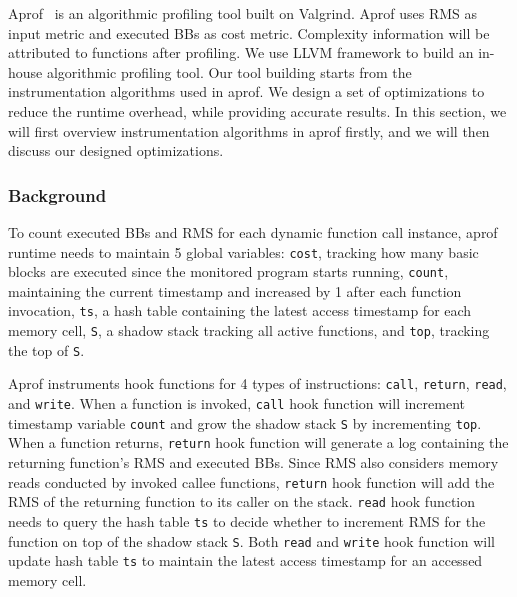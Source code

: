 Aprof~\cite{Aprof1, Aprof2} is an algorithmic profiling tool built on Valgrind. 
Aprof uses RMS as input metric and executed BBs as cost metric.
Complexity information will be attributed to functions after profiling. 
We use LLVM framework to build an in-house algorithmic profiling tool.
Our tool building starts from the instrumentation algorithms used in aprof. 
We design a set of optimizations to reduce the runtime overhead, 
while providing accurate results.
In this section, we will first overview instrumentation algorithms in aprof firstly, 
and we will then discuss our designed optimizations. 

\subsubsection{Background}
To count executed BBs and RMS for each dynamic function call instance,
aprof runtime needs to maintain 5 global variables:
\texttt{cost}, 
tracking how many basic blocks are executed since the monitored program starts running, 
\texttt{count}, 
maintaining the current timestamp and increased by 1 after each function invocation, 
\texttt{ts}, 
a hash table containing the latest access timestamp for each memory cell,
\texttt{S}, 
a shadow stack tracking all active functions, 
and \texttt{top}, 
tracking the top of \texttt{S}.

Aprof instruments hook functions for 4 types of instructions: 
\texttt{call}, \texttt{return}, \texttt{read}, and \texttt{write}. 
When a function is invoked, 
\texttt{call} hook function will increment timestamp variable \texttt{count}
and grow the shadow stack \texttt{S} by incrementing \texttt{top}.
When a function returns,
\texttt{return} hook function will 
generate a log 
containing the returning function's RMS and executed BBs.
Since RMS also considers memory reads conducted by 
invoked callee functions, 
\texttt{return} hook function will add 
the RMS of the returning function to its caller on the stack. 
\texttt{read} hook function needs to query the hash table \texttt{ts} to decide  
whether to increment RMS for the function on top of the shadow stack \texttt{S}.
Both \texttt{read} and \texttt{write} 
hook function will update hash table \texttt{ts}
to maintain the latest access timestamp for an accessed memory cell. 


